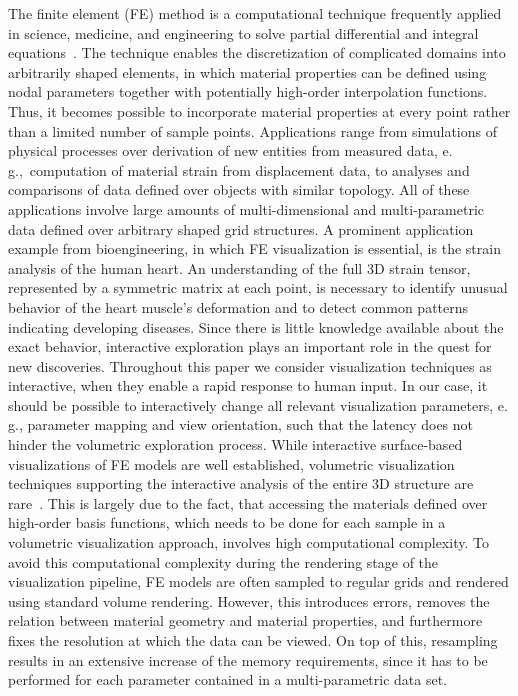 \documentclass[journal]{vgtc}                %
\begin{document}
The finite element (FE) method is a computational technique frequently applied in science, medicine, and engineering to solve partial differential and integral equations~\cite{Young00}. The technique enables the discretization of complicated domains into arbitrarily shaped elements, in which material properties can be defined using nodal parameters together with potentially high-order interpolation functions. Thus, it becomes possible to incorporate material properties at every point rather than a limited number of sample points. Applications range from simulations of physical processes over derivation of new entities from measured data, e.\,g.,~computation of material strain from displacement data, to analyses and comparisons of data defined over objects with similar topology. All of these applications involve large amounts of multi-dimensional and multi-parametric data defined over arbitrary shaped grid structures. A prominent application example from bioengineering, in which FE visualization is essential, is the strain analysis of the human heart. An understanding of the full 3D strain tensor, represented by a symmetric matrix at each point, is necessary to identify unusual behavior of the heart muscle's deformation and to detect common patterns indicating developing diseases. Since there is little knowledge available about the exact behavior, interactive exploration plays an important role in the quest for new discoveries. Throughout this paper we consider visualization techniques as interactive, when they enable a rapid response to human input. In our case, it should be possible to interactively change all relevant visualization parameters, e.\,g., parameter mapping and view orientation, such that the latency does not hinder the volumetric exploration process. While interactive surface-based visualizations of FE models are well established, volumetric visualization techniques supporting the interactive analysis of the entire 3D structure are rare~\cite{Wihelms90}. This is largely due to the fact, that accessing the materials defined over high-order basis functions, which needs to be done for each sample in a volumetric visualization approach, involves high computational complexity. To avoid this computational complexity during the rendering stage of the visualization pipeline, FE models are often sampled to regular grids and rendered using standard volume rendering. However, this introduces errors, removes the relation between material geometry and material properties, and furthermore fixes the resolution at which the data can be viewed. On top of this, resampling results in an extensive increase of the memory requirements, since it has to be performed for each parameter contained in a multi-parametric data set.
\end{document}
